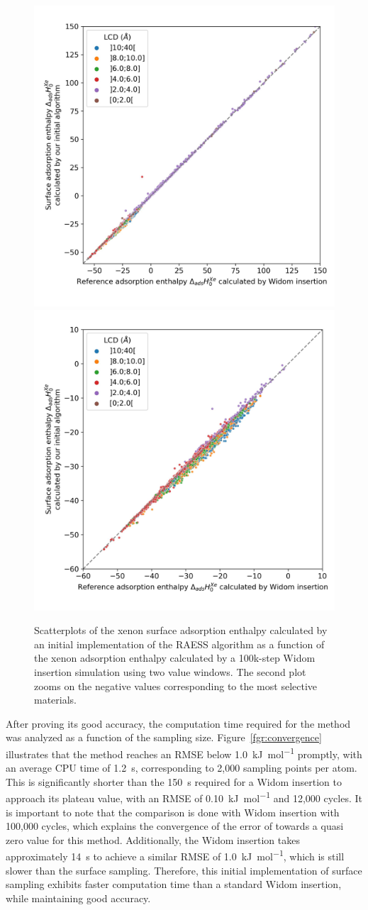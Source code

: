 \documentclass[main]{subfiles}
\begin{document}
\begin{figure}[ht]
  \centering
  \includegraphics[width=0.45\linewidth]{figures/3-fastsim/H_Xe_widom_vs_H_Xe_surface_spiral_overview.jpg}
  \hfill
  \includegraphics[width=0.45\linewidth]{figures/3-fastsim/H_Xe_widom_vs_H_Xe_surface_spiral_zoom.jpg}
    \caption{Scatterplots of the xenon surface adsorption enthalpy calculated by an initial implementation of the RAESS algorithm as a function of the xenon adsorption enthalpy calculated by a 100k-step Widom insertion simulation using two value windows. The second plot zooms on the negative values corresponding to the most selective materials.}\label{fgr:surface_sampling_init}
\end{figure}

After proving its good accuracy, the computation time required for the method was analyzed as a function of the sampling size. Figure~\ref{fgr:convergence} illustrates that the method reaches an RMSE below \SI{1.0}{\kilo\joule\per\mole} promptly, with an average CPU time of \SI{1.2}{\second}, corresponding to 2,000 sampling points per atom. This is significantly shorter than the \SI{150}{\second} required for a Widom insertion to approach its plateau value, with an RMSE of \SI{0.10}{\kilo\joule\per\mole} and 12,000 cycles. It is important to note that the comparison is done with Widom insertion with 100,000 cycles, which explains the convergence of the error of towards a quasi zero value for this method. Additionally, the Widom insertion takes approximately \SI{14}{\second} to achieve a similar RMSE of \SI{1.0}{\kilo\joule\per\mole}, which is still slower than the surface sampling. Therefore, this initial implementation of surface sampling exhibits faster computation time than a standard Widom insertion, while maintaining good accuracy.
\end{document}
